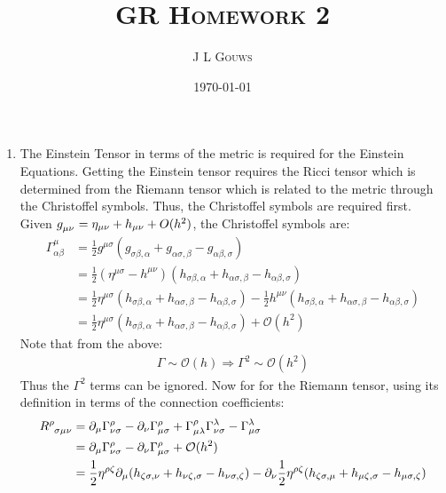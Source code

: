 \documentclass[12pt,a4]{article}
\title{
\textsc{GR Homework 2}
}
\author{\textsc{J L Gouws}
}
\date{\today
\\[1cm]}
\begin{document}
\thispagestyle{empty}

\maketitle

\begin{enumerate}
  \item
    The Einstein Tensor in terms of the metric is required for the Einstein Equations.
    Getting the Einstein tensor requires the Ricci tensor which is determined from the Riemann tensor which is related to the metric through the Christoffel symbols.
    Thus, the Christoffel symbols are required first.
    Given $\tensor{g}{_\mu_\nu} = \eta_{\mu\nu} + h_{\mu\nu} + O(h^2)$, the Christoffel symbols are:
    \begin{align*}
      \Gamma^\mu_{\alpha \beta} &= \frac{1}{2} g^{\mu \sigma} (g_{\sigma\beta, \alpha} + g_{\alpha\sigma, \beta} - g_{\alpha\beta, \sigma})\\
                                  &= \frac{1}{2} (\eta^{\mu \sigma} - h^{\mu\nu}) (h_{\sigma\beta, \alpha} + h_{\alpha\sigma, \beta} - h_{\alpha\beta, \sigma})\\
                                  &= \frac{1}{2} \eta^{\mu \sigma} (h_{\sigma\beta, \alpha} + h_{\alpha\sigma, \beta} - h_{\alpha\beta, \sigma}) - \frac{1}{2} h^{\mu\nu} (h_{\sigma\beta, \alpha} + h_{\alpha\sigma, \beta} - h_{\alpha\beta, \sigma})\\
                                  &= \frac{1}{2} \eta^{\mu \sigma} (h_{\sigma\beta, \alpha} + h_{\alpha\sigma, \beta} - h_{\alpha\beta, \sigma}) + \mathcal{O}(h^2)
    \end{align*}
    Note that from the above:
    \begin{align*}
      \Gamma \sim \mathcal{O}(h) \Rightarrow \Gamma^2 \sim \mathcal{O} (h^2)
    \end{align*}
    Thus the $\Gamma^2$ terms can be ignored.
    Now for for the Riemann tensor, using its definition in terms of the connection coefficients:
    \begin{align*}
      \tensor{R}{^\rho_\sigma_\mu_\nu} &= \partial_\mu \Gamma^\rho_{\nu\sigma } - \partial_\nu \Gamma^\rho_{\mu\sigma } + \Gamma^\rho_{\mu\lambda}\Gamma^\lambda_{\nu\sigma} - \Gamma^\lambda_{\mu\sigma}\\
                                      &= \partial_\mu \Gamma^\rho_{\nu\sigma } - \partial_\nu \Gamma^\rho_{\mu\sigma } + \mathcal{O}(h^2)\\
                                      &= \frac{1}{2}\eta^{\rho \zeta} \partial_\mu (h_{\zeta\sigma, \nu} + h_{\nu\zeta, \sigma} - h_{\nu\sigma, \zeta}) - \partial_\nu \frac{1}{2} \eta^{\rho \zeta} (h_{\zeta\sigma, \mu} + h_{\mu\zeta, \sigma} - h_{\mu\sigma, \zeta})\\

\end{align*}
\end{enumerate}
\end{document}
